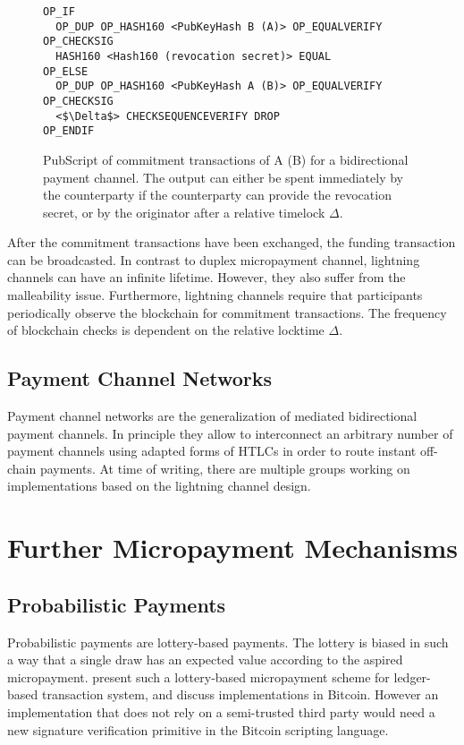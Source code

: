 \begin{figure}
\begin{lstlisting}[breaklines,mathescape=true]
OP_IF
  OP_DUP OP_HASH160 <PubKeyHash B (A)> OP_EQUALVERIFY OP_CHECKSIG
  HASH160 <Hash160 (revocation secret)> EQUAL
OP_ELSE
  OP_DUP OP_HASH160 <PubKeyHash A (B)> OP_EQUALVERIFY OP_CHECKSIG
  <$\Delta$> CHECKSEQUENCEVERIFY DROP
OP_ENDIF
\end{lstlisting} 
\caption{PubScript of commitment transactions of A (B) for a bidirectional payment channel. The output can either be spent immediately by the counterparty if the counterparty can provide the revocation secret, or by the originator after a relative timelock $\Delta$.}
\label{fig:pubScriptCommitment}
\end{figure}

After the commitment transactions have been exchanged, the funding transaction can be broadcasted. 
In contrast to duplex micropayment channel, lightning channels can have an infinite lifetime. However, they also suffer from the malleability issue.
Furthermore, lightning channels require that participants periodically observe the blockchain for commitment transactions. The frequency of blockchain checks is dependent on the relative locktime $\Delta$. 


\subsection{Payment Channel Networks}
\label{sec:paymentchannelnetworks}

Payment channel networks are the generalization of mediated bidirectional payment channels. In principle they allow to interconnect an arbitrary number of payment channels using adapted forms of HTLCs in order to route instant off-chain payments. At time of writing, there are multiple groups working on implementations based on the lightning channel design. 


\section{Further Micropayment Mechanisms}

\subsection{Probabilistic Payments}

Probabilistic payments \cite{wheeler1996transactions,rivest1996payword,rivest1997electronic} are lottery-based payments. The lottery is biased in such a way that a single draw has an expected value according to the aspired micropayment.
\cite{Pass:2015:MDC:2810103.2813713} present such a lottery-based micropayment scheme for ledger-based transaction system, and discuss implementations in Bitcoin. However an implementation that does not rely on a semi-trusted third party would need a new signature verification primitive in the Bitcoin scripting language. 

